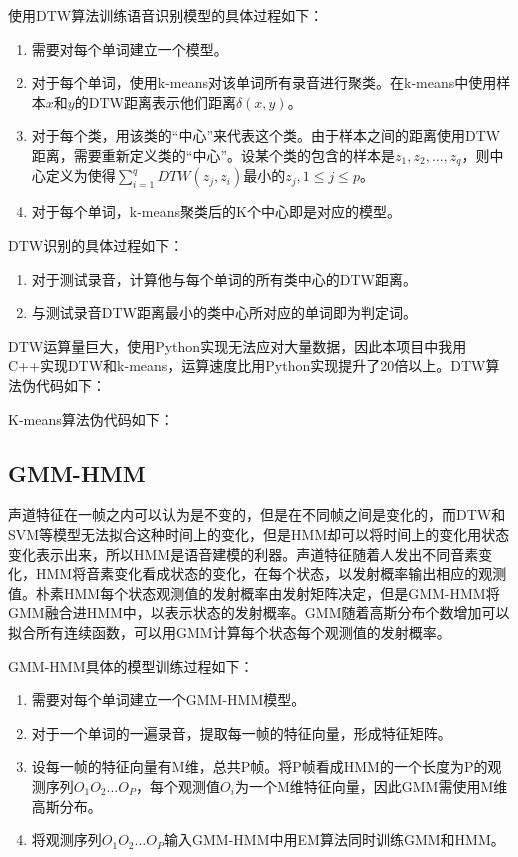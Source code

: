 \documentclass[UTF8]{article}
\begin{document}
使用DTW算法训练语音识别模型的具体过程如下：
\begin{enumerate}
	\item 需要对每个单词建立一个模型。
	\item 对于每个单词，使用k-means对该单词所有录音进行聚类。在k-means中使用样本$x$和$y$的DTW距离表示他们距离$\delta(x, y)$。
	\item 对于每个类，用该类的``中心''来代表这个类。由于样本之间的距离使用DTW距离，需要重新定义类的``中心''。设某个类的包含的样本是$z_1, z_2, ..., z_q$，则中心定义为使得$\sum_{i=1}^qDTW(z_j,z_i)$最小的$z_j, 1 \le j \le p$。
	\item 对于每个单词，k-means聚类后的K个中心即是对应的模型。
\end{enumerate}

DTW识别的具体过程如下：
\begin{enumerate}
	\item 对于测试录音，计算他与每个单词的所有类中心的DTW距离。
	\item 与测试录音DTW距离最小的类中心所对应的单词即为判定词。
\end{enumerate}

DTW运算量巨大，使用Python实现无法应对大量数据，因此本项目中我用C++实现DTW和k-means，运算速度比用Python实现提升了20倍以上。DTW算法伪代码如下：
~\\

\vspace{10pt}

K-means算法伪代码如下：
~\\


\subsection{GMM-HMM}
声道特征在一帧之内可以认为是不变的，但是在不同帧之间是变化的，而DTW和SVM等模型无法拟合这种时间上的变化，但是HMM却可以将时间上的变化用状态变化表示出来，所以HMM是语音建模的利器。声道特征随着人发出不同音素变化，HMM将音素变化看成状态的变化，在每个状态，以发射概率输出相应的观测值。朴素HMM每个状态观测值的发射概率由发射矩阵决定，但是GMM-HMM将GMM融合进HMM中，以表示状态的发射概率。GMM随着高斯分布个数增加可以拟合所有连续函数，可以用GMM计算每个状态每个观测值的发射概率。

GMM-HMM具体的模型训练过程如下：
\begin{enumerate}
	\item 需要对每个单词建立一个GMM-HMM模型。
	\item 对于一个单词的一遍录音，提取每一帧的特征向量，形成特征矩阵。
	\item 设每一帧的特征向量有M维，总共P帧。将P帧看成HMM的一个长度为P的观测序列$O_1O_2 ... O_P$，每个观测值$O_i$为一个M维特征向量，因此GMM需使用M维高斯分布。
	\item 将观测序列$O_1O_2 ... O_P$输入GMM-HMM中用EM算法同时训练GMM和HMM。
\end{enumerate}
\end{document}
